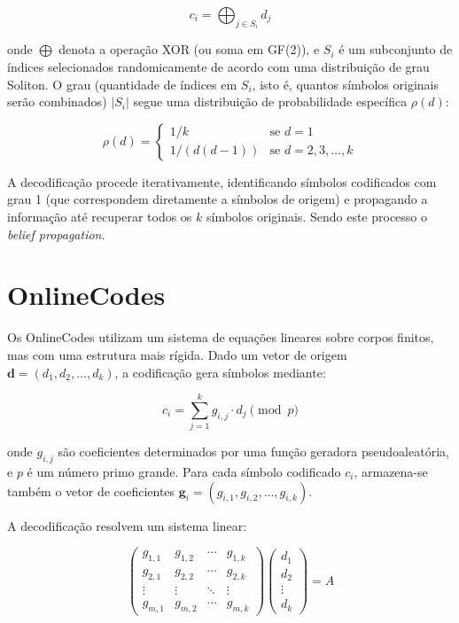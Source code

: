 \begin{equation}
c_i = \bigoplus_{j \in S_i} d_j
\end{equation}

onde $\bigoplus$ denota a operação XOR (ou soma em GF(2)), e $S_i$ é um subconjunto de índices selecionados randomicamente de acordo com uma distribuição de grau Soliton. O grau (quantidade de índices em $S_i$, isto é, quantos símbolos originais serão combinados) $|S_i|$ segue uma distribuição de probabilidade específica $\rho(d)$:

\begin{equation}
\rho(d) = \begin{cases}
1/k & \text{se } d = 1 \\
1/(d(d-1)) & \text{se } d = 2, 3, \ldots, k
\end{cases}
\end{equation}

A decodificação procede iterativamente, identificando símbolos codificados com grau 1 (que correspondem diretamente a símbolos de origem) e propagando a informação até recuperar todos os $k$ símbolos originais. Sendo este processo o \emph{belief propagation}.

\section{OnlineCodes}

Os OnlineCodes utilizam um sistema de equações lineares sobre corpos finitos, mas com uma estrutura mais rígida. Dado um vetor de 
origem $\mathbf{d} = (d_1, d_2, \ldots, d_k)$, a codificação gera símbolos mediante:

\begin{equation}
c_i = \sum_{j=1}^{k} g_{i,j} \cdot d_j \pmod{p}
\end{equation}

onde $g_{i,j}$ são coeficientes determinados por uma função geradora pseudoaleatória, e $p$ é um número primo grande. Para cada símbolo 
codificado $c_i$, armazena-se também o vetor de coeficientes $\mathbf{g}_i = (g_{i,1}, g_{i,2}, \ldots, g_{i,k})$.

A decodificação resolvem um sistema linear:

\begin{equation}
\begin{pmatrix}
g_{1,1} & g_{1,2} & \cdots & g_{1,k} \\
g_{2,1} & g_{2,2} & \cdots & g_{2,k} \\
\vdots & \vdots & \ddots & \vdots \\
g_{m,1} & g_{m,2} & \cdots & g_{m,k}
\end{pmatrix}
\begin{pmatrix}
d_1 \\ d_2 \\ \vdots \\ d_k
\end{pmatrix}
= A
\end{equation}

